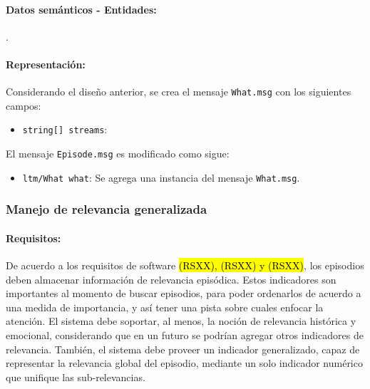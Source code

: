 

\paragraph{Datos semánticos - Entidades:}
.




\paragraph{Representación:}
Considerando el diseño anterior, se crea el mensaje \texttt{What.msg} con los siguientes campos:
\begin{itemize}
	\item \texttt{string[] streams}: 
\end{itemize}

El mensaje \texttt{Episode.msg} es modificado como sigue:
\begin{itemize}
	\item \texttt{ltm/What what}: Se agrega una instancia del mensaje \texttt{What.msg}.
\end{itemize}

\subsubsection{Manejo de relevancia generalizada}

\paragraph{Requisitos:}
De acuerdo a los requisitos de software \hl{(RSXX), (RSXX) y (RSXX)}, los episodios deben almacenar información de relevancia episódica. Estos indicadores son importantes al momento de buscar episodios, para poder ordenarlos de acuerdo a una medida de importancia, y así tener una pista sobre cuales enfocar la atención. El sistema debe soportar, al menos, la noción de relevancia histórica y emocional, considerando que en un futuro se podrían agregar otros indicadores de relevancia. También, el sistema debe proveer un indicador generalizado, capaz de representar la relevancia global del episodio, mediante un solo indicador numérico que unifique las sub-relevancias.


